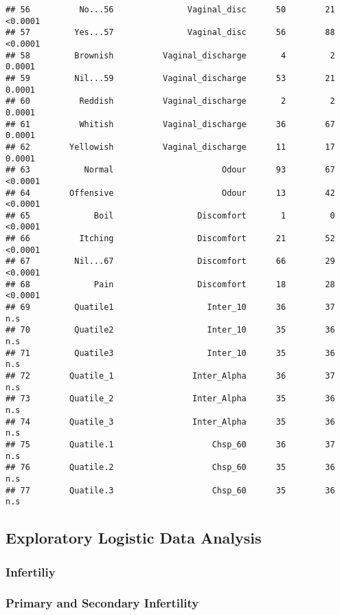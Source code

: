 \documentclass[
]{article}
\begin{document}
\begin{verbatim}
## 56          No...56               Vaginal_disc      50        21   <0.0001
## 57         Yes...57               Vaginal_disc      56        88   <0.0001
## 58         Brownish          Vaginal_discharge       4         2    0.0001
## 59         Nil...59          Vaginal_discharge      53        21    0.0001
## 60          Reddish          Vaginal_discharge       2         2    0.0001
## 61          Whitish          Vaginal_discharge      36        67    0.0001
## 62        Yellowish          Vaginal_discharge      11        17    0.0001
## 63           Normal                      Odour      93        67   <0.0001
## 64        Offensive                      Odour      13        42   <0.0001
## 65             Boil                 Discomfort       1         0   <0.0001
## 66          Itching                 Discomfort      21        52   <0.0001
## 67         Nil...67                 Discomfort      66        29   <0.0001
## 68             Pain                 Discomfort      18        28   <0.0001
## 69         Quatile1                   Inter_10      36        37       n.s
## 70         Quatile2                   Inter_10      35        36       n.s
## 71         Quatile3                   Inter_10      35        36       n.s
## 72        Quatile_1                Inter_Alpha      36        37       n.s
## 73        Quatile_2                Inter_Alpha      35        36       n.s
## 74        Quatile_3                Inter_Alpha      35        36       n.s
## 75        Quatile.1                    Chsp_60      36        37       n.s
## 76        Quatile.2                    Chsp_60      35        36       n.s
## 77        Quatile.3                    Chsp_60      35        36       n.s
\end{verbatim}

\hypertarget{exploratory-logistic-data-analysis}{%
\subsection{Exploratory Logistic Data
Analysis}\label{exploratory-logistic-data-analysis}}

\hypertarget{infertiliy}{%
\subsubsection{Infertiliy}\label{infertiliy}}

\hypertarget{primary-and-secondary-infertility}{%
\subsubsection{Primary and Secondary
Infertility}\label{primary-and-secondary-infertility}}
\end{document}
